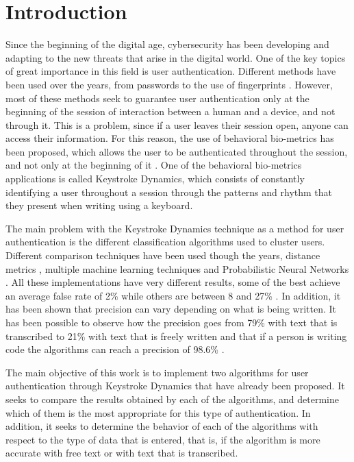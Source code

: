\section{Introduction}

Since the beginning of the digital age, cybersecurity has been developing and adapting to 
the new threats that arise in the digital world. One of the key topics of great importance 
in this field is user authentication. Different methods have been used over the years, from 
passwords to the use of fingerprints \cite{web}. However, most of these methods seek to guarantee user authentication only at the beginning of the session of interaction between a 
human and a device, and not through it. This is a problem, since if a user leaves their 
session open, anyone can access their information. For this reason, the use of behavioral 
bio-metrics has been proposed, which allows the user to be authenticated throughout the session, 
and not only at the beginning of it \cite{behavior}. One of the behavioral bio-metrics 
applications is called Keystroke Dynamics, which consists of constantly identifying a user 
throughout a session through the patterns and rhythm that they present when writing using a 
keyboard.


The main problem with the Keystroke Dynamics technique as a method for user authentication 
is the different classification algorithms used to cluster users. Different comparison 
techniques have been used though the years, distance metrics \cite{combine_distance}, 
multiple machine learning techniques \cite{machine_learning} and Probabilistic Neural Networks 
\cite{pnn}. All these implementations have very different results, some of the best achieve 
an average false rate of 2\% while others are between 8 and 27\% \cite{typing_patterns}. 
In addition, it has been shown that precision can vary depending on what is being written. 
It has been possible to observe how the precision goes from 79\% with text that is transcribed 
to 21\% with text that is freely written \cite{old} and that if a person is writing code the 
algorithms can reach a precision of 98.6\% \cite{programmers}.

The main objective of this work is to implement two algorithms for user 
authentication through Keystroke Dynamics that have already been proposed. It seeks to 
compare the results obtained by each of the algorithms, and determine which of them is 
the most appropriate for this type of authentication. In addition, it seeks to determine 
the behavior of each of the algorithms with respect to the type of data that is entered, 
that is, if the algorithm is more accurate with free text or with text that is transcribed.